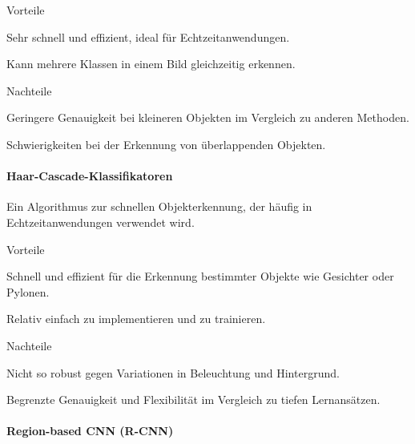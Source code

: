 \documentclass[../main.tex]{subfiles}
\begin{document}
\begin{minipage}[t]{0.48\textwidth}
\begin{items}
  \item [Vorteile]
  \item Sehr schnell und effizient, ideal für Echtzeitanwendungen.
  \item Kann mehrere Klassen in einem Bild gleichzeitig erkennen.
\end{items}
\end{minipage}
\hfill
\begin{minipage}[t]{0.48\textwidth}
\begin{items}
  \item [Nachteile]
  \item Geringere Genauigkeit bei kleineren Objekten im Vergleich zu anderen Methoden.
  \item Schwierigkeiten bei der Erkennung von überlappenden Objekten.
\end{items}
\end{minipage}

\paragraph{Haar-Cascade-Klassifikatoren}

Ein Algorithmus zur schnellen Objekterkennung, der häufig in Echtzeitanwendungen verwendet wird.

\begin{minipage}[t]{0.48\textwidth}
\begin{items}
  \item [Vorteile]
  \item Schnell und effizient für die Erkennung bestimmter Objekte wie Gesichter oder Pylonen.
  \item Relativ einfach zu implementieren und zu trainieren.
\end{items}
\end{minipage}
\hfill
\begin{minipage}[t]{0.48\textwidth}
\begin{items}
  \item [Nachteile]
  \item Nicht so robust gegen Variationen in Beleuchtung und Hintergrund.
  \item Begrenzte Genauigkeit und Flexibilität im Vergleich zu tiefen Lernansätzen.
\end{items}
\end{minipage}

\paragraph{Region-based CNN (R-CNN)}
\end{document}
